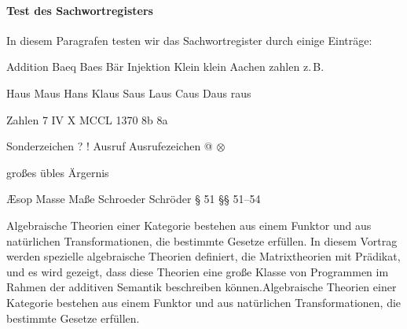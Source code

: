 \paragraph{Test des Sachwortregisters} In diesem Paragrafen testen
wir das Sachwortregister durch einige Einträge:

Addition
Baeq
Baes
Bär
Injektion
Klein
klein
Aachen
zahlen
z.\,B.

Haus
Maus
Hans
Klaus
Saus
Laus
Caus
Daus
raus

Zahlen
7
IV
X
MCCL
1370
8b
8a

Sonderzeichen
?
!\index{+!}
Ausruf
Ausrufezeichen
@
$\otimes$\index{$\otimes$}

großes übles Ärgernis

Æsop
Masse
Maße
Schroeder
Schröder
§ 51
§§ 51--54

Algebraische Theorien einer Kategorie bestehen aus einem Funktor und
aus natürlichen Transformationen, die bestimmte Gesetze erfüllen. In
diesem Vortrag werden spezielle algebraische Theorien definiert, die
Matrixtheorien mit Prädikat, und es wird gezeigt, dass diese Theorien
eine große Klasse von Programmen im Rahmen der additiven Semantik
beschreiben können.\algtheorie\begriff Algebraische Theorien einer
Kategorie bestehen aus einem Funktor und aus natürlichen Transformationen,
die bestimmte Gesetze erfüllen.

\endinput
